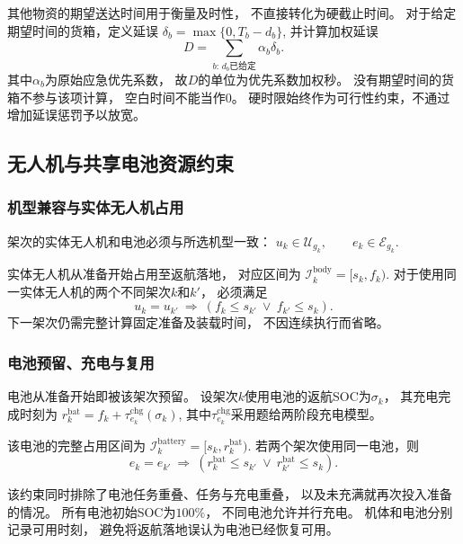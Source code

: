 \documentclass[bwprint]{gmcmthesis}
\begin{document}
其他物资的期望送达时间用于衡量及时性，
不直接转化为硬截止时间。
对于给定期望时间的货箱，定义延误
\(\delta_b=\max\{0,T_b-d_b\}\),
并计算加权延误
\begin{equation}
    D
    =
    \sum_{b:\,d_b\text{已给定}}
    \alpha_b\delta_b.
    \label{eq:q2_delay}
\end{equation}
其中$\alpha_b$为原始应急优先系数，
故$D$的单位为优先系数加权秒。
没有期望时间的货箱不参与该项计算，
空白时间不能当作0。
硬时限始终作为可行性约束，不通过增加延误惩罚予以放宽。

\subsection{无人机与共享电池资源约束}

\subsubsection{机型兼容与实体无人机占用}

架次的实体无人机和电池必须与所选机型一致：
\(u_k\in\mathcal{U}_{g_k}, \qquad e_k\in\mathcal{E}_{g_k}\).

实体无人机从准备开始占用至返航落地，
对应区间为
\(\mathcal{I}_k^{\mathrm{body}}=[s_k,f_k)\).
对于使用同一实体无人机的两个不同架次$k$和$k'$，
必须满足
\begin{equation}
    u_k=u_{k'}
    \ \Longrightarrow\
    \left(
    f_k\leq s_{k'}
    \ \lor\
    f_{k'}\leq s_k
    \right).
\end{equation}
下一架次仍需完整计算固定准备及装载时间，
不因连续执行而省略。

\subsubsection{电池预留、充电与复用}

电池从准备开始即被该架次预留。
设架次$k$使用电池的返航SOC为$\sigma_k$，
其充电完成时刻为
\(r_k^{\mathrm{bat}} = f_k+ \tau_{e_k}^{\mathrm{chg}}(\sigma_k)\),
其中$\tau_{e_k}^{\mathrm{chg}}$采用题给两阶段充电模型。

该电池的完整占用区间为
\(\mathcal{I}_k^{\mathrm{battery}} = [s_k,r_k^{\mathrm{bat}})\).
若两个架次使用同一电池，则
\begin{equation}
    e_k=e_{k'}
    \ \Longrightarrow\
    \left(
    r_k^{\mathrm{bat}}\leq s_{k'}
    \ \lor\
    r_{k'}^{\mathrm{bat}}\leq s_k
    \right).
\end{equation}

该约束同时排除了电池任务重叠、任务与充电重叠，
以及未充满就再次投入准备的情况。
所有电池初始SOC为$100\%$，
不同电池允许并行充电。
机体和电池分别记录可用时刻，
避免将返航落地误认为电池已经恢复可用。
\end{document}
